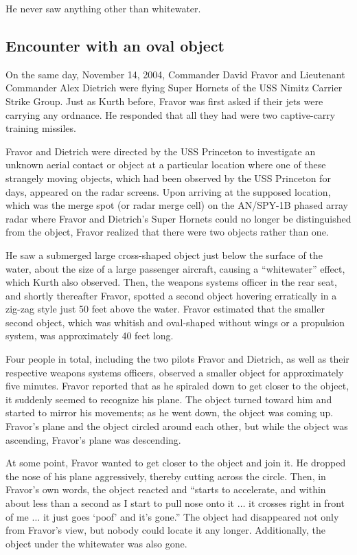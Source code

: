 He never saw anything other than whitewater.


\subsection{Encounter with an oval object}

On the same day, November 14, 2004, Commander David Fravor and Lieutenant Commander Alex Dietrich
were flying Super Hornets of the USS Nimitz Carrier Strike Group.
Just as Kurth before,
Fravor was first asked if their jets were carrying any ordnance. He responded that all they had were two captive-carry training missiles.

Fravor and Dietrich were directed by the USS Princeton to investigate an unknown aerial contact or object at a particular location
where one of these strangely moving objects, which had been observed by the USS Princeton for days, appeared on the radar screens.
Upon arriving at the supposed location, which was the merge spot (or radar merge cell) on the AN/SPY-1B phased array radar where
Fravor and Dietrich's Super Hornets could no longer be distinguished from the object,
Fravor realized that there were two objects rather than one.

He saw a submerged large cross-shaped object just below the surface of the water,
about the size of a large passenger aircraft, causing a ``whitewater'' effect, which Kurth also observed.
Then, the weapons systems officer in the rear seat, and shortly thereafter Fravor, spotted a second object hovering erratically in a zig-zag style just 50 feet above the water. Fravor estimated that the smaller second object, which was whitish and
oval-shaped without wings or a propulsion system, was approximately 40 feet long.

Four people in total, including the two pilots Fravor and Dietrich, as well as their respective weapons systems officers,
observed a smaller object for approximately five minutes. Fravor reported that as he spiraled down to get closer to the object,
it suddenly seemed to recognize his plane. The object turned toward him and started to mirror his movements; as he went down,
the object was coming up. Fravor's plane and the object circled around each other, but while the object was ascending, Fravor's plane was descending.

At some point, Fravor wanted to get closer to the object and join it.
He dropped the nose of his plane aggressively, thereby cutting across the circle.
Then, in Fravor's own words, the object reacted and ``starts to accelerate, and within about less than a second as
I start to pull nose onto it $\ldots$ it crosses right in front of me $\ldots$ it just goes `poof' and it's gone.''
The object had disappeared not only from Fravor's view, but nobody could locate it any longer.
Additionally, the object under the whitewater was also gone.

